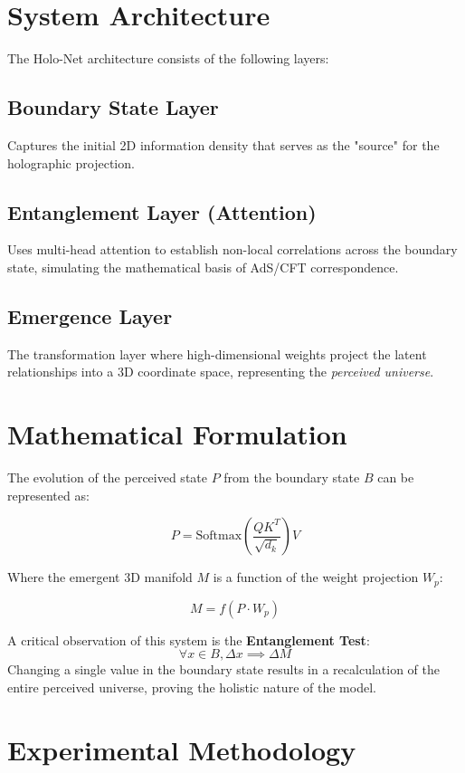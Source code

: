 \documentclass[12pt]{article}
\begin{document}
\section{System Architecture}

The Holo-Net architecture consists of the following layers:

\subsection{Boundary State Layer}
Captures the initial 2D information density that serves as the "source" for the holographic projection.

\subsection{Entanglement Layer (Attention)}
Uses multi-head attention to establish non-local correlations across the boundary state, simulating the mathematical basis of AdS/CFT correspondence.

\subsection{Emergence Layer}
The transformation layer where high-dimensional weights project the latent relationships into a 3D coordinate space, representing the \textit{perceived universe}.

\section{Mathematical Formulation}

The evolution of the perceived state $P$ from the boundary state $B$ can be represented as:

\[
P = \text{Softmax}\left(\frac{QK^T}{\sqrt{d_k}}\right)V
\]

Where the emergent 3D manifold $M$ is a function of the weight projection $W_p$:

\[
M = f(P \cdot W_p)
\]

A critical observation of this system is the \textbf{Entanglement Test}:
\[
\forall x \in B, \Delta x \implies \Delta M
\]
Changing a single value in the boundary state results in a recalculation of the entire perceived universe, proving the holistic nature of the model.

\section{Experimental Methodology}
\end{document}
